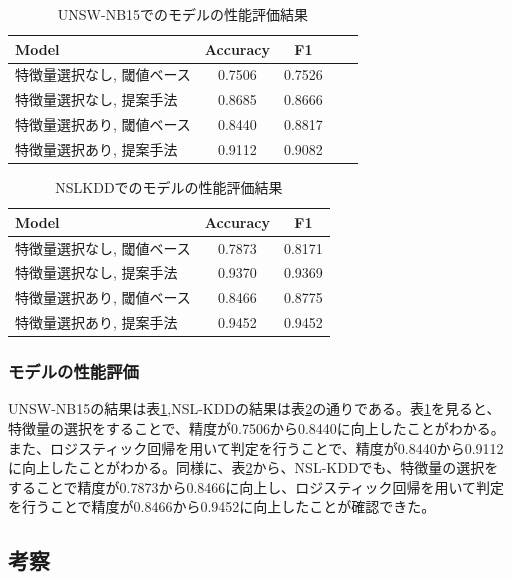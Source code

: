 \documentclass{css}
\begin{document}
\begin{table}[ht]
    \caption{UNSW-NB15でのモデルの性能評価結果}
    \centering
    \footnotesize
    \begin{tabular}{lcccc}
        \hline\hline
        Model & Accuracy & F1 \\
        \hline
        特徴量選択なし, 閾値ベース & 0.7506 & 0.7526 \\
        特徴量選択なし, 提案手法 & 0.8685 & 0.8666 \\
        特徴量選択あり, 閾値ベース & 0.8440 & 0.8817 \\
        特徴量選択あり, 提案手法 & 0.9112 & 0.9082 \\
        \hline
    \end{tabular}
    \label{tab:model_performance_UNSW-NB15}
\end{table}

\begin{table}[ht]
    \caption{NSLKDDでのモデルの性能評価結果}
    \centering
    \footnotesize
    \begin{tabular}{lcc}
        \hline\hline
        Model & Accuracy & F1 \\
        \hline
        特徴量選択なし, 閾値ベース& 0.7873 & 0.8171 \\
        特徴量選択なし, 提案手法 & 0.9370 & 0.9369 \\ 
        特徴量選択あり, 閾値ベース& 0.8466 & 0.8775 \\
        特徴量選択あり, 提案手法 & 0.9452 & 0.9452 \\
        \hline
    \end{tabular}
    \label{tab:model_performance_NSL-KDD}
\end{table}

\subsubsection{モデルの性能評価}
UNSW-NB15の結果は表\ref{tab:model_performance_UNSW-NB15},NSL-KDDの結果は表\ref{tab:model_performance_NSL-KDD}の通りである。表\ref{tab:model_performance_UNSW-NB15}を見ると、特徴量の選択をすることで、精度が0.7506から0.8440に向上したことがわかる。また、ロジスティック回帰を用いて判定を行うことで、精度が0.8440から0.9112に向上したことがわかる。同様に、表\ref{tab:model_performance_NSL-KDD}から、NSL-KDDでも、特徴量の選択をすることで精度が0.7873から0.8466に向上し、ロジスティック回帰を用いて判定を行うことで精度が0.8466から0.9452に向上したことが確認できた。

\subsection{考察}
\end{document}
